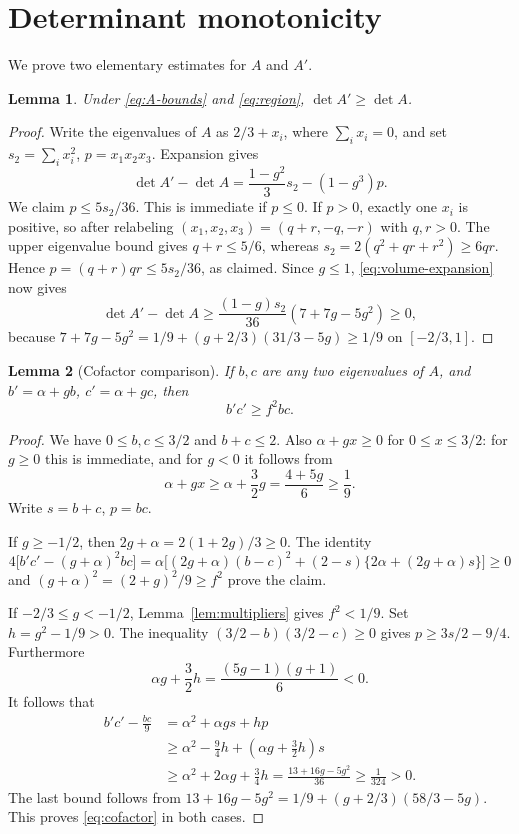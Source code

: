 \documentclass[11pt,a4paper]{article}
\newtheorem{lemma}{Lemma}
\begin{document}
\section{Determinant monotonicity}
We prove two elementary estimates for $A$ and $A'$.

\begin{lemma}\label{lem:volume}
Under \eqref{eq:A-bounds} and \eqref{eq:region}, $\det A'\ge\det A$.
\end{lemma}
\begin{proof}
Write the eigenvalues of $A$ as $2/3+x_i$, where $\sum_i x_i=0$,
and set $s_2=\sum_i x_i^2$, $p=x_1x_2x_3$. Expansion gives
\begin{equation}\label{eq:volume-expansion}
 \det A'-\det A=\frac{1-g^2}{3}s_2-(1-g^3)p.
\end{equation}
We claim $p\le5s_2/36$. This is immediate if $p\le0$.
If $p>0$, exactly one $x_i$ is positive, so after relabeling
$(x_1,x_2,x_3)=(q+r,-q,-r)$ with $q,r>0$.
The upper eigenvalue bound gives $q+r\le5/6$, whereas
$s_2=2(q^2+qr+r^2)\ge6qr$. Hence
$p=(q+r)qr\le5s_2/36$, as claimed.
Since $g\le1$, \eqref{eq:volume-expansion} now gives
\[
 \det A'-\det A\ge
 \frac{(1-g)s_2}{36}(7+7g-5g^2)\ge0,
\]
because
$7+7g-5g^2=1/9+(g+2/3)(31/3-5g)\ge1/9$ on $[-2/3,1]$.
\end{proof}

\begin{lemma}[Cofactor comparison]\label{lem:cofactor}
If $b,c$ are any two eigenvalues of $A$, and
$b'=\alpha+gb$, $c'=\alpha+gc$, then
\begin{equation}\label{eq:cofactor}
 b'c'\ge f^2bc.
\end{equation}
\end{lemma}
\begin{proof}
We have $0\le b,c\le3/2$ and $b+c\le2$. Also
$\alpha+gx\ge0$ for $0\le x\le3/2$: for $g\ge0$ this is
immediate, and for $g<0$ it follows from
\begin{equation}\label{eq:positive}
 \alpha+gx\ge\alpha+\frac32g=\frac{4+5g}{6}\ge\frac19.
\end{equation}
Write $s=b+c$, $p=bc$.

If $g\ge-1/2$, then $2g+\alpha=2(1+2g)/3\ge0$.
The identity
\[
 4\bigl[b'c'-(g+\alpha)^2bc\bigr]
 =\alpha\bigl[(2g+\alpha)(b-c)^2
       +(2-s)\{2\alpha+(2g+\alpha)s\}\bigr]\ge0
\]
and $(g+\alpha)^2=(2+g)^2/9\ge f^2$ prove the claim.

If $-2/3\le g<-1/2$, Lemma~\ref{lem:multipliers} gives $f^2<1/9$.
Set $h=g^2-1/9>0$. The inequality
$(3/2-b)(3/2-c)\ge0$ gives $p\ge3s/2-9/4$.
Furthermore
\[
 \alpha g+\frac32h=\frac{(5g-1)(g+1)}6<0.
\]
It follows that
\begin{align*}
 b'c'-\frac{bc}{9}
 &=\alpha^2+\alpha gs+hp\\
 &\ge\alpha^2-\frac94h+
       \left(\alpha g+\frac32h\right)s\\
 &\ge\alpha^2+2\alpha g+\frac34h
   =\frac{13+16g-5g^2}{36}\ge\frac{1}{324}>0.
\end{align*}
The last bound follows from
$13+16g-5g^2=1/9+(g+2/3)(58/3-5g)$.
This proves \eqref{eq:cofactor} in both cases.
\end{proof}
\end{document}

